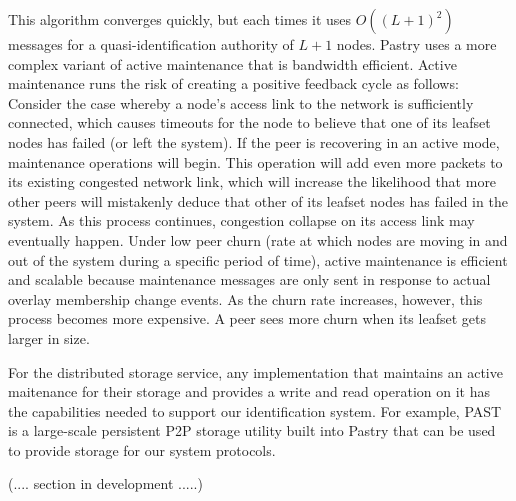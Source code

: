 This algorithm converges quickly, but each times it uses $O((L+1)^2)$ messages
for a quasi-identification authority of $L+1$ nodes.
Pastry uses a more complex variant of active maintenance that is
bandwidth efficient.
Active maintenance runs the risk of creating a positive feedback cycle as
follows: Consider the case whereby a node's access link to the network is
sufficiently connected, which causes timeouts for the node to believe that one
of its leafset nodes has failed (or left the system). If the peer is recovering
in an active mode, maintenance operations will begin. This operation will add
even more packets to its existing congested network link, which will increase
the likelihood that more other peers will mistakenly deduce that other of its leafset
nodes has failed in the system. As this process continues, congestion collapse
on its access link may eventually happen.
Under low peer churn (rate at which nodes are moving in and out of the
system during a specific period of time), active maintenance is efficient and scalable because
maintenance messages are only sent in response to actual overlay membership
change events. As the churn rate increases, however, this process becomes more
expensive. A peer sees more churn when its leafset gets larger in size.

For the distributed storage service, any implementation that maintains an
active maitenance for their storage and provides a write and read operation on
it has the capabilities needed to support our identification system. For
example, PAST~\cite{druschel2001past} is a large-scale persistent P2P storage
utility built into Pastry that can be used to provide storage for our system
protocols.

(.... section in development .....)


%

